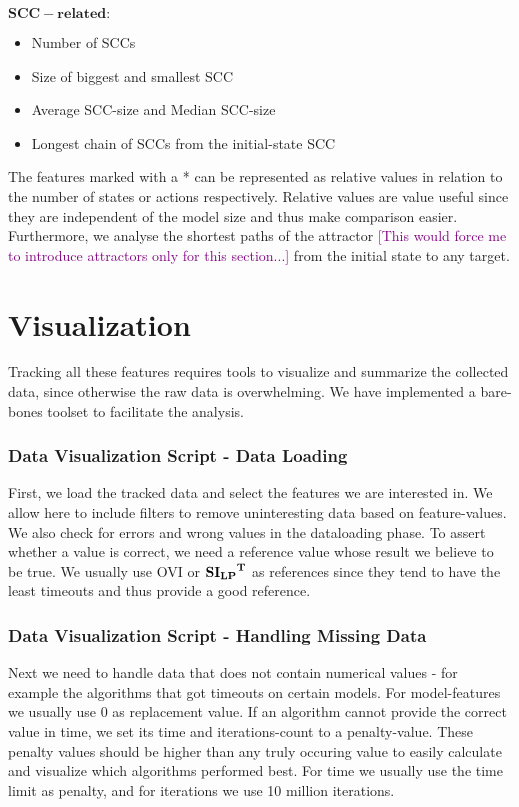 $\mathbf{SCC-related:}$
\begin{itemize}
\item Number of SCCs
\item Size of biggest and smallest SCC
\item Average SCC-size and Median SCC-size
\item Longest chain of SCCs from the initial-state SCC
\end{itemize}

The features marked with a * can be represented as relative values in relation to the number of states or actions respectively.
Relative values are value useful since they are independent of the model size and thus make comparison easier.
Furthermore, we analyse the shortest paths of the attractor \textcolor{purple}{[This would force me to introduce attractors only for this section...]} from the initial state to any target.

\section{Visualization}

Tracking all these features requires tools to visualize and summarize the collected data, since otherwise the raw data is overwhelming.
We have implemented a bare-bones toolset to facilitate the analysis. 

\subsubsection{Data Visualization Script - Data Loading}
First, we load the tracked data and select the features we are interested in. We allow here to include filters to remove uninteresting data based on feature-values.
We also check for errors and wrong values in the dataloading phase. To assert whether a value is correct, we need a reference value whose result we believe to be true.
We usually use OVI or $\mathbf{\mathbf{SI_{LP}}^T}$ as references since they tend to have the least timeouts and thus provide a good reference.

\subsubsection{Data Visualization Script - Handling Missing Data}
Next we need to handle data that does not contain numerical values - for example the algorithms that got timeouts on certain models.
For model-features we usually use 0 as replacement value. 
If an algorithm cannot provide the correct value in time, we set its time and iterations-count to a penalty-value.
These penalty values should be higher than any truly occuring value to easily calculate and visualize which algorithms performed best.
For time we usually use the time limit as penalty, and for iterations we use 10 million iterations.

